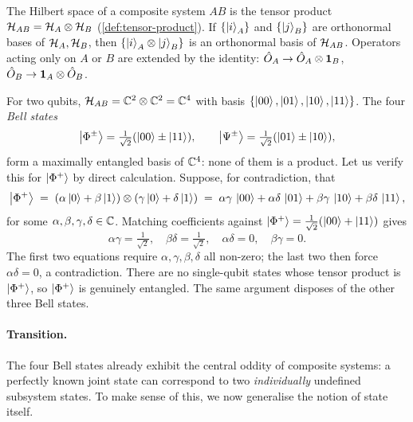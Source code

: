 \begin{postulate}
\label{post:composite}
The Hilbert space of a composite system $AB$ is the tensor product
$\mathcal{H}_{AB}=\mathcal{H}_A\otimes\mathcal{H}_B$
(\cref{def:tensor-product}). If $\{\ket{i}_A\}$ and $\{\ket{j}_B\}$
are orthonormal bases of $\mathcal{H}_A,\mathcal{H}_B$, then
$\{\ket{i}_A\otimes\ket{j}_B\}$ is an orthonormal basis of
$\mathcal{H}_{AB}$. Operators acting only on $A$ or $B$ are extended by
the identity: $\hat{O}_A\to\hat{O}_A\otimes\mathbf{1}_B$,
$\hat{O}_B\to\mathbf{1}_A\otimes\hat{O}_B$.
\end{postulate}

\begin{example}
\label{ex:bell-states}
For two qubits, $\mathcal{H}_{AB}=\mathbb{C}^2\otimes\mathbb{C}^2=\mathbb{C}^4$ with basis
$\{\ket{00},\ket{01},\ket{10},\ket{11}\}$. The four \emph{Bell
states}
\begin{equation}
\ket{\Phi^\pm} = \tfrac{1}{\sqrt2}(\ket{00}\pm\ket{11}),
\qquad
\ket{\Psi^\pm} = \tfrac{1}{\sqrt2}(\ket{01}\pm\ket{10}),
\end{equation}
form a maximally entangled basis of $\mathbb{C}^4$: none of them is a
product. Let us verify this for $\ket{\Phi^+}$ by direct
calculation. Suppose, for contradiction, that
\begin{equation}
\ket{\Phi^+} \;=\;
(\alpha\ket{0}+\beta\ket{1})\otimes(\gamma\ket{0}+\delta\ket{1})
\;=\; \alpha\gamma\,\ket{00} + \alpha\delta\,\ket{01}
   + \beta\gamma\,\ket{10} + \beta\delta\,\ket{11},
\end{equation}
for some $\alpha,\beta,\gamma,\delta\in\mathbb{C}$. Matching coefficients
against $\ket{\Phi^+}=\tfrac{1}{\sqrt2}(\ket{00}+\ket{11})$ gives
\begin{equation}
\alpha\gamma=\tfrac{1}{\sqrt2},\quad
\beta\delta=\tfrac{1}{\sqrt2},\quad
\alpha\delta=0,\quad
\beta\gamma=0.
\end{equation}
The first two equations require $\alpha,\gamma,\beta,\delta$ all
non-zero; the last two then force $\alpha\delta=0$, a
contradiction. There are no single-qubit states whose tensor
product is $\ket{\Phi^+}$, so $\ket{\Phi^+}$ is genuinely
entangled. The same argument disposes of the other three Bell
states.
\end{example}

\paragraph{Transition.}
The four Bell states already exhibit the central oddity of composite
systems: a perfectly known joint state can correspond to two
\emph{individually} undefined subsystem states. To make sense of this,
we now generalise the notion of state itself.


